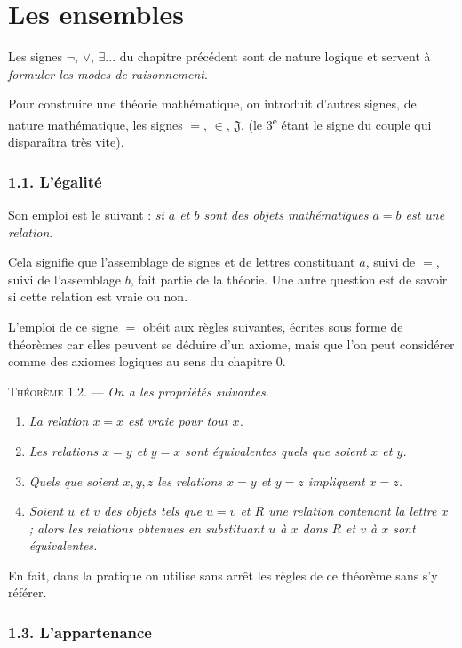 \chapter{Les ensembles}

Les signes $\neg$, $\lor$, $\exists$... du chapitre précédent sont de nature logique et servent à \emph{formuler les modes de raisonnement}.

Pour construire une théorie mathématique, on introduit d'autres signes, de nature mathématique, les signes $=$, $\in$, $\mathfrak J$, (le 3\textsuperscript{e} étant le signe du couple qui disparaîtra très vite).

\subsection*{1.1. L'égalité}

Son emploi est le suivant : \emph{si $a$ et $b$ sont des objets mathématiques $a=b$ est une relation}.

Cela signifie que l'assemblage de signes et de lettres constituant $a$, suivi de $=$, suivi de l'assemblage $b$, fait partie de la théorie. Une autre question est de savoir si cette relation est vraie ou non.

L'emploi de ce signe $=$ obéit aux règles suivantes, écrites sous forme de théorèmes car elles peuvent se déduire d'un axiome, mais que l'on peut considérer comme des axiomes logiques au sens du chapitre 0.

\medskip\noindent\textsc{Théorème 1.2.} --- \emph{On a les propriétés suivantes.}
\begin{enumerate}[label=\arabic*)]
\item \emph{La relation $x=x$ est vraie pour tout $x$.}
\item \emph{Les relations $x=y$ et $y=x$ sont équivalentes quels que soient $x$ et $y$.}
\item \emph{Quels que soient $x,y,z$ les relations $x=y$ et $y=z$ impliquent $x=z$.}
\item \emph{Soient $u$ et $v$ des objets tels que $u=v$ et $R$ une relation contenant la lettre $x$ ; alors les relations obtenues en substituant $u$ à $x$ dans $R$ et $v$ à $x$ sont équivalentes.}
\end{enumerate}

En fait, dans la pratique on utilise sans arrêt les règles de ce théorème sans s'y référer.

\subsection*{1.3. L'appartenance}

